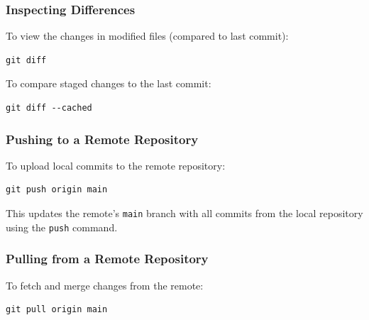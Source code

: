 \documentclass{article}
\newcommand{\codecmd}[1]{\textcolor[rgb]{0,0.5,0}{\texttt{#1}}}
\begin{document}
\subsubsection{Inspecting Differences}

To view the changes in modified files (compared to last commit):

\begin{tcolorbox}[colback=mintgreen, colframe=green!40!black, boxrule=0.5pt, sharp corners]
\begin{verbatim}
git diff
\end{verbatim}
\end{tcolorbox}

\noindent To compare staged changes to the last commit:

\begin{tcolorbox}[colback=mintgreen, colframe=green!40!black, boxrule=0.5pt, sharp corners]
\begin{verbatim}
git diff --cached
\end{verbatim}
\end{tcolorbox}

\subsubsection{Pushing to a Remote Repository}

To upload local commits to the remote repository:

\begin{tcolorbox}[colback=mintgreen, colframe=green!40!black, boxrule=0.5pt, sharp corners]
\begin{verbatim}
git push origin main
\end{verbatim}
\end{tcolorbox}

\noindent This updates the remote’s \codecmd{main} branch with all commits from the local repository using the \codecmd{push} command.

\subsubsection{Pulling from a Remote Repository}

To fetch and merge changes from the remote:

\begin{tcolorbox}[colback=mintgreen, colframe=green!40!black, boxrule=0.5pt, sharp corners]
\begin{verbatim}
git pull origin main
\end{verbatim}
\end{tcolorbox}
\end{document}
